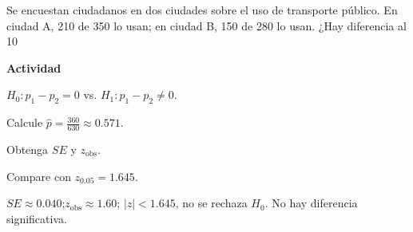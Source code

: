 \begin{ejercicio}
Se encuestan ciudadanos en dos ciudades sobre el uso de transporte público.
En ciudad A, 210 de 350 lo usan;
en ciudad B, 150 de 280 lo usan.
¿Hay diferencia al 10%


\textbf{Actividad}
\begin{pasos}
  \item $H_0:p_1-p_2=0$ vs. $H_1:p_1-p_2\neq 0$.
  \item Calcule $\hat{p}=\tfrac{360}{630}\approx 0.571$.
  \item Obtenga $SE$ y $z_{\text{obs}}$.
  \item Compare con $z_{0.05}=1.645$.
\end{pasos}

\begin{clave}
$SE\approx 0.040$;\quad $z_{\text{obs}}\approx 1.60$;\quad
$|z|<1.645$, no se rechaza $H_0$.
No hay diferencia significativa.
\end{clave}
\end{ejercicio}

